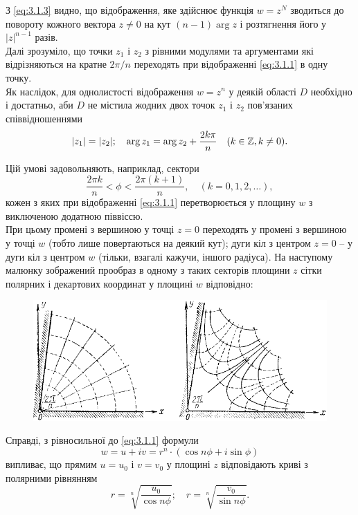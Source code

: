 З \eqref{eq:3.1.3} видно, що відображення, яке здійснює функція $w = z^N$ зводиться до повороту кожного вектора $z \ne 0$ на кут $(n - 1) \arg z$ і розтягнення його у $|z|^{n-1}$ разів. \\

Далі зрозуміло, що точки $z_1$ і $z_2$ з рівними модулями та аргументами які відрізняються на кратне $2 \pi / n$ переходять при відображенні \eqref{eq:3.1.1} в одну точку. \\

Як наслідок, для однолистості відображення $w = z^n$ у деякій області $D$ необхідно і достатньо, аби $D$ не містила жодних двох точок $z_1$ і $z_2$ пов'язаних співвідношеннями
\begin{equation}
	\label{eq:3.1.4}
	|z_1| = |z_2|; \quad \arg z_1 = \arg z_2 + \dfrac{2 k \pi}{n} \quad (k \in \mathbb{Z}, k \ne 0).
\end{equation}

Цій умові задовольняють, наприклад, сектори
\begin{equation}
	\label{eq:3.1.5}
	\frac{2\pi k}{n} < \phi < \frac{2\pi(k+1)}{n}, \quad (k = 0, 1, 2, \ldots),
\end{equation}
кожен з яких при відображенні \eqref{eq:3.1.1} перетворюється у площину $w$ з виключеною додатною піввіссю.  \\

При цьому промені з вершиною у точці $z = 0$ переходять у промені з вершиною у точці $w$ (тобто лише повертаються на деякий кут); дуги кіл з центром $z = 0$ -- у дуги кіл з центром $w$ (тільки, взагалі кажучи, іншого радіуса). На наступому малюнку зображений прообраз в одному з таких секторів площини $z$ сітки полярних і декартових координат у площині $w$ відповідно:

\begin{figure}[H]
	\centering
	\includegraphics[width=.8\linewidth]{mal-09.png}
\end{figure}

Справді, з рівносильної до \eqref{eq:3.1.1} формули
\begin{equation}
	\label{eq:3.1.6}
	w = u + i v = r^n \cdot (\cos n \phi + i \sin \phi)
\end{equation}
випливає, що прямим $u = u_0$ і $v = v_0$ у площині $z$ відповідають криві з полярними рівнянням
\begin{equation}
	\label{eq:3.1.7}
	r = \sqrt[n]{\frac{u_0}{\cos n\phi}}; \quad r = \sqrt[n]{\frac{v_0}{\sin n\phi}}.
\end{equation}

